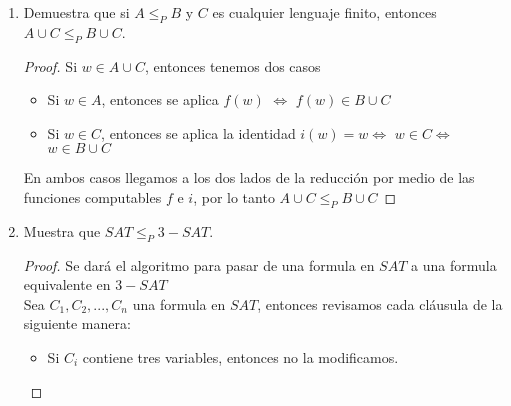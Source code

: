 \documentclass[letterpaper,10pt]{article}
\begin{document}
\begin{enumerate}
\begin{itemize}
\begin{itemize}
\begin{proof}
                Como dimos una MT no determinista que decide a $A$ en tiempo
                $O(n)$, llegamos a que $A\in NP$.
                
         	\end{proof}
         	
         \end{itemize}
         
     \end{itemize}
     
     \item Demuestra que si $A \leq_P B$ y $C$ es cualquier lenguaje finito,
     entonces $A \cup C \leq_P B \cup C$.
     
     \begin{proof}
     	Si $w\in A \cup C$, entonces tenemos dos casos
     		
        \begin{itemize}
            
            \item Si $w\in A$, entonces se aplica $f(w)$ $\Leftrightarrow $
            $f(w)\in B \cup C$
     			
            \item Si $w\in C$, entonces se aplica la identidad $i(w)=w 
            \Leftrightarrow $ $w\in C \Leftrightarrow $ $w\in B\cup C$
        
        \end{itemize}
     	
        En ambos casos llegamos a los dos lados de la reducción por medio de
        las funciones computables $f$ e $i$, por lo tanto $A \cup C \leq_P B
        \cup C$
        
     \end{proof}
     
     \item Muestra que $SAT \leq_P 3-SAT$.
     	
     \begin{proof}
         Se dará el algoritmo para pasar de una formula en $SAT$ a una formula
         equivalente en $3-SAT$\\
     		
         Sea $C_1,C_2,...,C_n$ una formula en $SAT$, entonces revisamos cada
         cláusula de la siguiente manera:
         
         \begin{itemize}
             
             \item Si $C_i$ contiene tres variables, entonces no la modificamos.
     			

\end{itemize}
\end{proof}
\end{enumerate}
\end{document}
